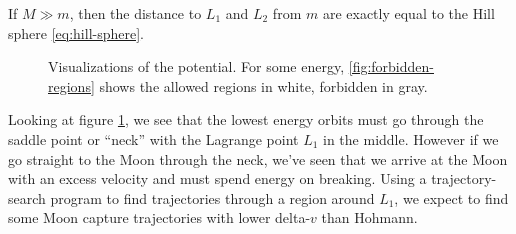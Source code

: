 If $M \gg m$, then the distance to $L_1$ and $L_2$ from $m$ are exactly equal to the Hill sphere \eqref{eq:hill-sphere}.

\begin{figure}[ht]
    \centering
        \caption{Visualizations of the potential. For some energy, \ref{fig:forbidden-regions} shows the allowed regions in white, forbidden in gray.}
    \label{fig:potential-visualizations}
\end{figure}
Looking at figure \ref{fig:potential-visualizations}, we see that the lowest energy orbits must go through the saddle point or ``neck'' with the Lagrange point $L_1$ in the middle. However if we go straight to the Moon through the neck, we've seen that we arrive at the Moon with an excess velocity and must spend energy on breaking. Using a trajectory-search program to find trajectories through a region around $L_1$, we expect to find some Moon capture trajectories with lower delta-$v$ than Hohmann.
